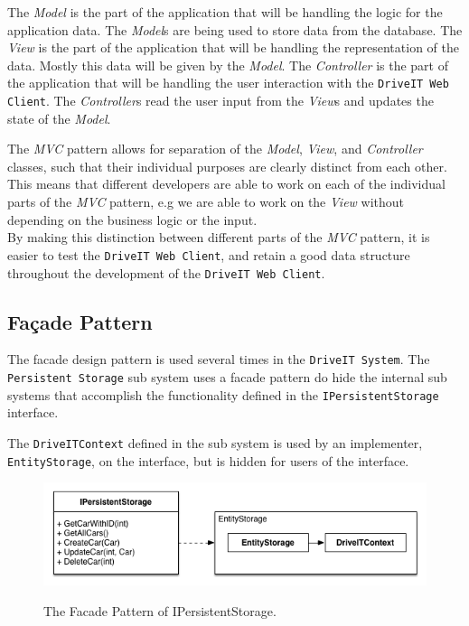 The \textit{Model} is the part of the application that will be handling the logic for the application data. The \textit{Model}s are being used to store data from the database.
The \textit{View} is the part of the application that will be handling the representation of the data. Mostly this data will be given by the \textit{Model}.
The \textit{Controller} is the part of the application that will be handling the user interaction with the \texttt{DriveIT Web Client}. The \textit{Controller}s read the user input from the \textit{View}s and updates the state of the \textit{Model}.

The \textit{MVC} pattern allows for separation of the \textit{Model}, \textit{View}, and \textit{Controller} classes, such that their individual purposes are clearly distinct from each other. This means that different developers are able to work on each of the individual parts of the \textit{MVC} pattern, e.g we are able to work on the \textit{View} without depending on the business logic or the input.\\

By making this distinction between different parts of the \textit{MVC} pattern, it is easier to test the \texttt{DriveIT Web Client}, and retain a good data structure throughout the development of the \texttt{DriveIT Web Client}.

\subsection{Façade Pattern}
The facade design pattern is used several times in the \texttt{DriveIT System}.
The \texttt{Persistent Storage} sub system uses a facade pattern do hide the internal sub systems that accomplish the functionality defined in the \texttt{IPersistentStorage} interface.

The \texttt{DriveITContext} defined in the sub system is used by an implementer, \texttt{EntityStorage}, on the interface, but is hidden for users of the interface. 

\begin{figure}[H]
	\centering
	\includegraphics[scale=0.6]{Figures/FacadePatternPersistentStorage}\\
	\caption{The Facade Pattern of IPersistentStorage.}
	\label{fig:The Facade Pattern of IPersistentStorage.}
\end{figure}


